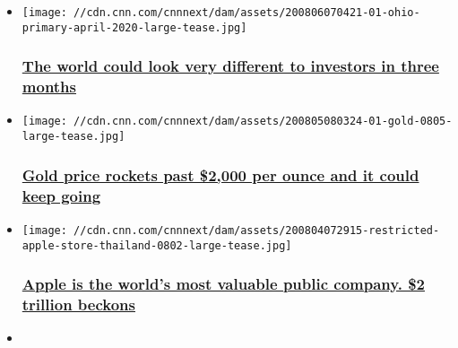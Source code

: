 \begin{itemize}
\item
  \href{/2020/08/06/investing/premarket-stocks-trading/index.html}{}

  \texttt{[image: //cdn.cnn.com/cnnnext/dam/assets/200806070421-01-ohio-primary-april-2020-large-tease.jpg]}

  \hypertarget{the-world-could-look-very-different-to-investors-in-three-months}{%
  \subsubsection{\texorpdfstring{\href{/2020/08/06/investing/premarket-stocks-trading/index.html}{The
  world could look very different to investors in three
  months}}{The world could look very different to investors in three months}}\label{the-world-could-look-very-different-to-investors-in-three-months}}
\item
  \href{/2020/08/05/investing/premarket-stocks-trading/index.html}{}

  \texttt{[image: //cdn.cnn.com/cnnnext/dam/assets/200805080324-01-gold-0805-large-tease.jpg]}

  \hypertarget{gold-price-rockets-past-2000-per-ounce-and-it-could-keep-going-}{%
  \subsubsection{\texorpdfstring{\href{/2020/08/05/investing/premarket-stocks-trading/index.html}{Gold
  price rockets past \$2,000 per ounce and it could keep going
  }}{Gold price rockets past \$2,000 per ounce and it could keep going }}\label{gold-price-rockets-past-2000-per-ounce-and-it-could-keep-going-}}
\item
  \href{/2020/08/04/investing/premarket-stocks-trading/index.html}{}

  \texttt{[image: //cdn.cnn.com/cnnnext/dam/assets/200804072915-restricted-apple-store-thailand-0802-large-tease.jpg]}

  \hypertarget{apple-is-the-worlds-most-valuable-public-company-2-trillion-beckons}{%
  \subsubsection{\texorpdfstring{\href{/2020/08/04/investing/premarket-stocks-trading/index.html}{Apple
  is the world's most valuable public company. \$2 trillion
  beckons}}{Apple is the world's most valuable public company. \$2 trillion beckons}}\label{apple-is-the-worlds-most-valuable-public-company-2-trillion-beckons}}
\item
  \href{/2020/08/03/investing/premarket-stocks-trading/index.html}{}


\end{itemize}
